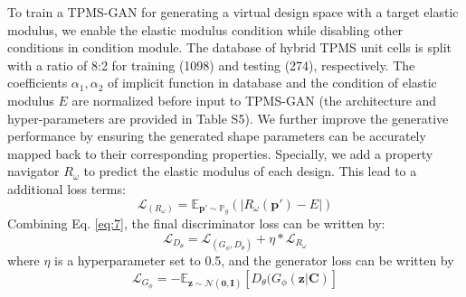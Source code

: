 \documentclass[preprint,review,12pt,authoryear]{elsarticle}
\begin{document}
To train a TPMS-GAN for generating a virtual design space with a target elastic modulus, we enable the elastic modulus condition while disabling other conditions in condition module. The database of hybrid TPMS unit cells is split with a ratio of 8:2 for training (1098) and testing (274), respectively. The coefficients $\alpha_1, \alpha_2$ of implicit function in database and the condition of elastic modulus $E$ are normalized before input to TPMS-GAN (the architecture and hyper-parameters are provided in Table S5). We further improve the generative performance by ensuring the generated shape parameters can be accurately mapped back to their corresponding properties. Specially, we add a property navigator $R_\omega$ to predict the elastic modulus of each design. This lead to a additional loss terms:
\begin{equation}
\mathcal{L}_{(R_\omega)}=\mathbb{E}_{\boldsymbol{p}' \sim \mathbb{P}_g}(|R_\omega(\boldsymbol{p}')-E|)
\label{eq:18}
\end{equation}
Combining Eq. \ref{eq:7}, the final discriminator loss can be written by:
\begin{equation}
\mathcal{L}_{D_\theta} =  \mathcal{L}_{(G_\phi, D_\theta)} + \eta *\mathcal{L}_{R_\omega}
\label{eq:19}
\end{equation}
where $\eta$ is a hyperparameter set to 0.5, and the generator loss can be written by 
\begin{equation}
\mathcal{L}_{G_\phi} =  - \mathbb{E}_{\boldsymbol{z}\sim \mathcal{N}(\boldsymbol{0},\boldsymbol{I})} \left[ D_\theta (G_\phi(\boldsymbol{z}|\boldsymbol{C})\right]
\label{eq:20}
\end{equation}
\end{document}
